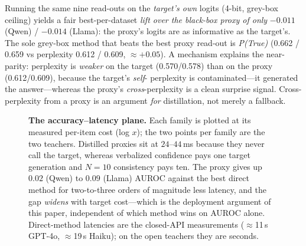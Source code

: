 \documentclass[11pt]{article}
\begin{document}
Running the same nine read-outs on the \emph{target's own} logits (4-bit, grey-box
ceiling) yields a fair best-per-dataset \emph{lift over the black-box proxy of only}
$-0.011$ (Qwen) / $-0.014$ (Llama): the proxy's logits are as informative as the
target's. The sole grey-box method that beats the best proxy read-out is
\emph{P(True)} (0.662 / 0.659 vs perplexity 0.612 / 0.609, $\approx{+}0.05$). A
mechanism explains the near-parity: perplexity is \emph{weaker} on the target
(0.570/0.578) than on the proxy (0.612/0.609), because the target's \emph{self}-%
perplexity is contaminated---it generated the answer---whereas the proxy's
\emph{cross}-perplexity is a clean surprise signal. Cross-perplexity from a proxy is an
argument \emph{for} distillation, not merely a fallback.

\begin{figure}[t]
\centering
{}
\caption{\textbf{The accuracy--latency plane.} Each family is plotted at its measured
per-item cost (log $x$); the two points per family are the two teachers. Distilled proxies sit
at $24$--$44$\,ms because they never call the target, whereas verbalized confidence pays one
target generation and $N{=}10$ consistency pays ten. The proxy gives up $0.02$ (Qwen) to $0.09$ (Llama) AUROC
against the best direct method for two-to-three orders of magnitude less latency, and the gap
\emph{widens} with target cost---which is the deployment argument of this paper, independent of
which method wins on AUROC alone. Direct-method latencies are the closed-API measurements
($\approx$11\,s GPT-4o, $\approx$19\,s Haiku); on the open teachers they are seconds.}
\label{fig:pareto}
\end{figure}
\end{document}
